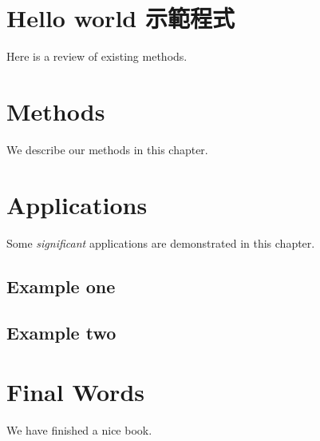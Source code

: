 \documentclass[
]{book}
\begin{document}
\hypertarget{chap-hello-world}{%
\chapter{Hello world 示範程式}\label{chap-hello-world}}

Here is a review of existing methods.

\hypertarget{methods}{%
\chapter{Methods}\label{methods}}

We describe our methods in this chapter.

\hypertarget{applications}{%
\chapter{Applications}\label{applications}}

Some \emph{significant} applications are demonstrated in this chapter.

\hypertarget{example-one}{%
\section{Example one}\label{example-one}}

\hypertarget{example-two}{%
\section{Example two}\label{example-two}}

\hypertarget{final-words}{%
\chapter{Final Words}\label{final-words}}

We have finished a nice book.

  
\end{document}
